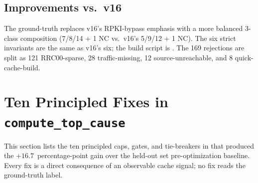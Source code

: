 \documentclass[sigcomm,nonatbib]{acmart}
\begin{document}
\subsection{Improvements vs.\ v16}

The ground-truth replaces v16's RPKI-bypass
emphasis with a more balanced 3-class composition
(7/8/14 + 1 NC vs.\ v16's 5/9/12 + 1 NC). The six
strict invariants are the same as v16's six; the
 build script is .
The 169 rejections are split as 121 RRC00-sparse,
28 traffic-missing, 12 source-unreachable, and
8 quick-cache-build.

\section{Ten Principled Fixes in \texttt{compute\_top\_cause}}
\label{sec:fixes}

This section lists the ten principled caps, gates, and
tie-breakers in
that produced the $+16.7$~percentage-point gain over the
held-out set pre-optimization baseline. Every fix is a direct
consequence of an observable cache signal; no fix reads
the ground-truth label.
\end{document}
